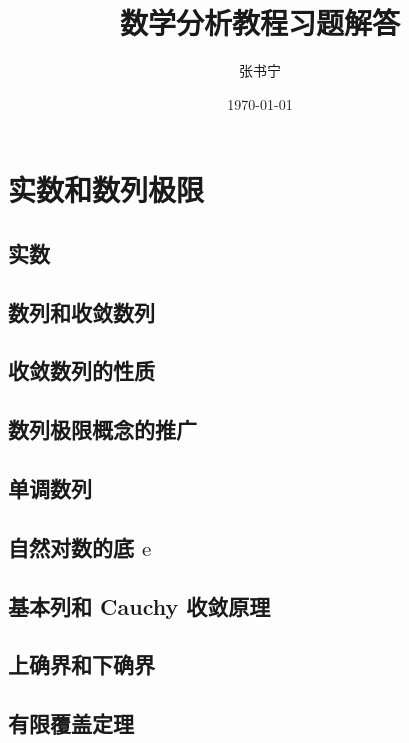 \documentclass[a4paper, 11pt]{ctexbook}
\title{数学分析教程习题解答}
\author{张书宁}
\date{\today}
\begin{document}
    \frontmatter
    \maketitle

    \tableofcontents
    \mainmatter

    \chapter{实数和数列极限}
        \section{实数}
        \section{数列和收敛数列}
            
        \section{收敛数列的性质}
            
        \section{数列极限概念的推广}
            
        \section{单调数列}
            
        \section{自然对数的底 $\mathrm{e}$}
            
        \section{基本列和 Cauchy 收敛原理}
            
        \section{上确界和下确界}
            
        \section{有限覆盖定理}
\end{document}

